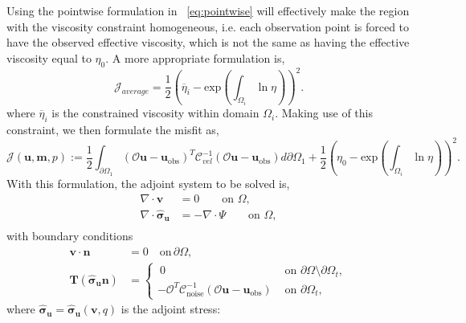 \documentclass[12pt]{article}
\newcommand{\mm}{{\ensuremath{\boldsymbol{m}}}}
\newcommand{\uu}{{\ensuremath{\boldsymbol{u}}}}
\newcommand{\vv}{{\ensuremath{\boldsymbol{v}}}}
\newcommand{\ssigma}{{\ensuremath{\boldsymbol{\sigma}}}}
\begin{document}

Using the pointwise formulation in ~\eqref{eq:pointwise} will effectively make the region with the viscosity constraint homogeneous, i.e. each observation point is forced to have the observed effective viscosity,  which is not the same as having the effective viscosity equal to $\eta_0$. A more appropriate formulation is,
\begin{equation}
 \mathcal{J}_{average}=\frac{1}{2}(\overline{\eta}_i - \text{exp}({\int_{\Omega_i} \ln \eta}))^{2}.
\end{equation}
where $\overline{\eta}_i$ is the constrained viscosity within domain $\Omega_i$.
Making use of this constraint, we then formulate the misfit as,
\begin{equation}
  \mathcal{J}(\uu,\mm,p):= \frac{1}{2}\int_{\partial \Omega_1} (\mathcal{O}\uu-\uu_{\text{obs}})^T\mathcal{C}^{-1}_{vel}(\mathcal{O}\uu-\uu_{\text{obs}})d\partial\Omega_1 
   +\frac{1}{2}(\eta_0 - \text{exp}({\int_{\Omega_i} \ln \eta}))^{2}.
\end{equation}
With this formulation, the adjoint system to be solved is,
\begin{equation}
  \label{eq:adjoint}
  \begin{split}
    \nabla \cdot \vv &=0 \qquad  \text{on } \Omega, \\
    \nabla \cdot \hat \ssigma_\uu&=-\nabla \cdot \Psi   \qquad \text{on } \Omega, \\
  \end{split}
\end{equation}
with boundary conditions
\begin{align*}
  \vv\cdot \textbf{n}&=0 \quad \text{on} \, \partial \Omega, \\
  \textbf{T}(\hat\ssigma_\uu \textbf{n})
  &=\begin{cases} \:0 & \text{ on }\partial \Omega\setminus
  \partial\Omega_t, \\
  -\mathcal{O}^T\mathcal{C}^{-1}_{\text{noise}}(\mathcal O \uu-\uu_{\text{obs}}) &\text{ on }
  \partial\Omega_t,
  \end{cases}
  \label{eq:adjoint}
\end{align*}
where $\hat\ssigma_\uu = \hat\ssigma_\uu(\vv,q)$ is the adjoint stress: 
\end{document}
